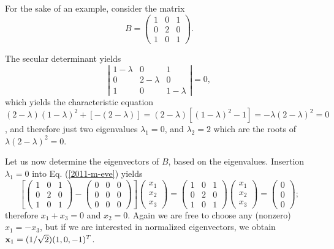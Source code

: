 {\color{blue}
\bexample
For the sake of an example, consider  the
{matrix}
\begin{equation}
B=
\begin{pmatrix}
1&0&1\\
0&2&0\\
1&0&1
\end{pmatrix}.
\end{equation}

The secular determinant yields
$$
\left|
\begin{matrix}
1-\lambda &0&1\\
0&2-\lambda &0\\
1&0&1-\lambda
\end{matrix}
\right| = 0,
$$
which yields the characteristic equation
$
(2-\lambda )(1-\lambda )^2 +[-(2-\lambda )]=
(2-\lambda )[(1-\lambda )^2 -1]=
-\lambda (2-\lambda )^2 =0$,
and therefore just two  eigenvalues
$\lambda_1=0$,  and
$\lambda_2=2$ which are the roots of $\lambda (2-\lambda )^2 =0$.

Let us now determine the eigenvectors of $B$, based on the eigenvalues.
Insertion  $\lambda_1=0$ into Eq. (\ref{2011-m-eve})  yields
\begin{equation}
\left[
\begin{pmatrix}
1&0&1\\
0&2&0\\
1&0&1
\end{pmatrix}  -
\begin{pmatrix}
0&0&0\\
0&0&0\\
0&0&0
\end{pmatrix}
\right]
\begin{pmatrix}
x_1\\
x_2\\
x_3
\end{pmatrix}
=
\begin{pmatrix}
1&0&1\\
0&2&0\\
1&0&1
\end{pmatrix}
\begin{pmatrix}
x_1\\
x_2\\
x_3
\end{pmatrix}
=
\begin{pmatrix}
0\\
0\\
0
\end{pmatrix}
;
\end{equation}
therefore $x_1+x_3=0$ and $x_2=0$.
Again we are free to choose any (nonzero) $x_1=-x_3$,
but if we are interested in normalized eigenvectors, we obtain
${\bf x}_1 =(1/\sqrt{2})(1,0,-1)^T$.

}
